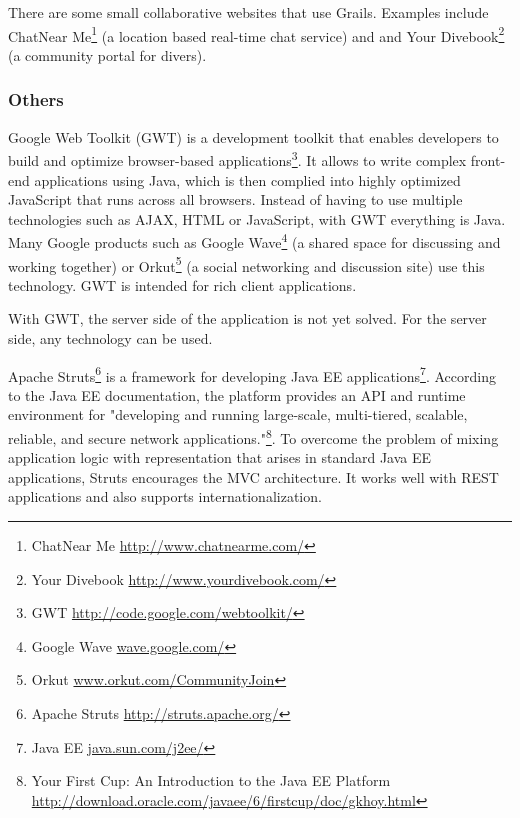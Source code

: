 There are some small collaborative websites that use Grails. Examples include ChatNear Me\footnote{ChatNear Me \url{http://www.chatnearme.com/}} (a location based real-time chat service) and and Your Divebook\footnote{Your Divebook \url{http://www.yourdivebook.com/}} (a community portal for divers). 

\subsubsection{Others}
Google Web Toolkit (GWT) is a development toolkit that enables developers to build and optimize browser-based applications\footnote{GWT \url{http://code.google.com/webtoolkit/}}.  It allows to write complex front-end applications using Java, which is then complied into highly optimized JavaScript that runs across all browsers. Instead of having to use multiple technologies such as AJAX, HTML or JavaScript, with GWT everything is Java. Many Google products such as Google Wave\footnote{Google Wave \url{wave.google.com/}} (a shared space for discussing and working together) or Orkut\footnote{Orkut \url{www.orkut.com/CommunityJoin}} (a social networking and discussion site) use this technology. GWT is intended for rich client applications. 

With GWT, the server side of the application is not yet solved. For the server side, any technology can be used. 


Apache Struts\footnote{Apache Struts \url{http://struts.apache.org/}} is a framework for developing Java EE applications\footnote{Java EE \url{java.sun.com/j2ee/}}.
According to the Java EE documentation, the platform provides an API and runtime environment for "developing and running large-scale, multi-tiered, scalable, reliable, and secure network applications."\footnote{Your First Cup: An Introduction to the Java EE Platform \url{http://download.oracle.com/javaee/6/firstcup/doc/gkhoy.html}}.
To overcome the problem of mixing application logic with representation that arises in standard Java EE applications, Struts encourages the MVC architecture. It works well with REST applications and also supports internationalization. 

